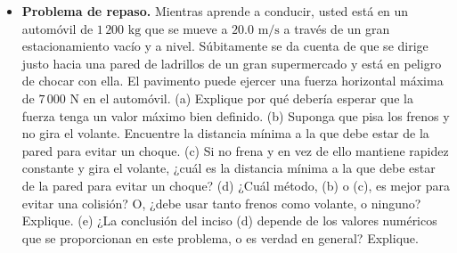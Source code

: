 \documentclass[11pt,a4paper]{article}
\begin{document}
\begin{itemize}
    \item[\textbf{35.}] \textbf{Problema de repaso.} Mientras aprende a conducir, usted está en un automóvil de $1\,200 \text{ kg}$ que se mueve a $20.0 \text{ m/s}$ a través de un gran estacionamiento vacío y a nivel. Súbitamente se da cuenta de que se dirige justo hacia una pared de ladrillos de un gran supermercado y está en peligro de chocar con ella. El pavimento puede ejercer una fuerza horizontal máxima de $7\,000 \text{ N}$ en el automóvil. (a) Explique por qué debería esperar que la fuerza tenga un valor máximo bien definido. (b) Suponga que pisa los frenos y no gira el volante. Encuentre la distancia mínima a la que debe estar de la pared para evitar un choque. (c) Si no frena y en vez de ello mantiene rapidez constante y gira el volante, ¿cuál es la distancia mínima a la que debe estar de la pared para evitar un choque? (d) ¿Cuál método, (b) o (c), es mejor para evitar una colisión? O, ¿debe usar tanto frenos como volante, o ninguno? Explique. (e) ¿La conclusión del inciso (d) depende de los valores numéricos que se proporcionan en este problema, o es verdad en general? Explique.
    \vspace*{8cm}
\end{itemize}

\newpage
\end{document}
